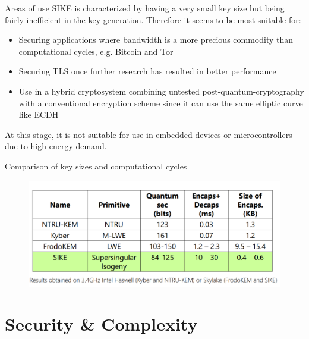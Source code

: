 \documentclass{beamer}
\begin{document}
\begin{frame}{Areas of use}
SIKE is characterized by having a very small key size but being fairly inefficient in the key-generation. Therefore it seems to be most suitable for:
\begin{itemize}[\textbullet]
	
	\item Securing applications where bandwidth is a more precious commodity than computational cycles, e.g. Bitcoin and Tor\pause
	\item Securing TLS once further research has resulted in better performance\pause
	\item Use in a hybrid cryptosystem combining untested post-quantum-cryptography with a conventional encryption scheme since it can use the same elliptic curve like ECDH	\pause
\end{itemize}
At this stage, it is not suitable for use in embedded devices or microcontrollers due to high energy demand.
\end{frame}

\begin{frame}{Comparison of key sizes and computational cycles}
\begin{figure} 
	\centering
	\includegraphics[width=1\linewidth]{performance}
	\label{fig:performance}
\end{figure}
\end{frame}

\section{Security \& Complexity}
\end{document}
